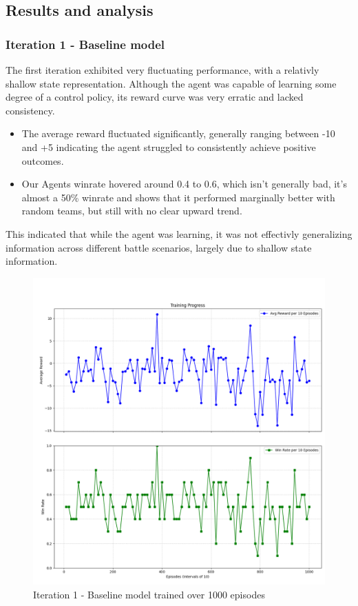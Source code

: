 \subsection{Results and analysis}
\subsubsection{Iteration 1 - Baseline model}
The first iteration exhibited very fluctuating performance, with a relativly shallow
state representation. Although the agent was capable of learning some degree of a control
policy, its reward curve was very erratic and lacked consistency.
\begin{itemize}
    \item The average reward fluctuated significantly, generally ranging between -10 and +5
          indicating the agent struggled to consistently achieve positive outcomes.
    \item Our Agents winrate hovered around 0.4 to 0.6, which isn't generally bad, it's almost a 50\% winrate
          and shows that it performed marginally better with random teams, but still with no clear upward trend.
\end{itemize}
This indicated that while the agent was learning, it was not effectivly generalizing
information across different battle scenarios, largely due to shallow state information.

\begin{figure}[H]
    \centering
    \includegraphics[width=\textwidth]{assets/Iteration-1-graphs.png}
    \caption{Iteration 1 - Baseline model trained over 1000 episodes}
    \label{fig:iteration-1-graphs}
\end{figure}

